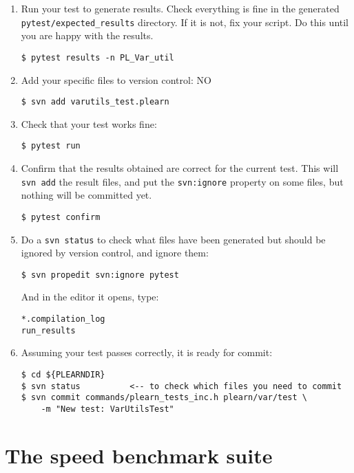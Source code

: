 \documentclass[11pt]{book}
\begin{document}
\begin{enumerate}
  \item Run your test to generate results. Check everything
  is fine in the generated {\tt pytest/expected\_results} directory. If
  it is not, fix your script. Do this until you are happy with the
  results.
\begin{verbatim}
$ pytest results -n PL_Var_util
\end{verbatim}

  \item Add your specific files to version control: NO
\begin{verbatim}
$ svn add varutils_test.plearn
\end{verbatim}

  \item \label{run} Check that your test works fine:
\begin{verbatim}
$ pytest run
\end{verbatim}

  \item \label{confirm} Confirm that the results obtained are correct
  for the current test. This will {\tt svn add} the result files, and
  put the {\tt svn:ignore} property on some files, but nothing will be
  committed yet.
\begin{verbatim}
$ pytest confirm
\end{verbatim}

  \item Do a {\tt svn status} to check what files have been generated
  but should be ignored by version control, and ignore them:
\begin{verbatim}
$ svn propedit svn:ignore pytest
\end{verbatim}
  And in the editor it opens, type:
\begin{verbatim}
*.compilation_log
run_results
\end{verbatim}

  \item Assuming your test passes correctly, it is ready for commit:
\begin{verbatim}
$ cd ${PLEARNDIR}
$ svn status          <-- to check which files you need to commit
$ svn commit commands/plearn_tests_inc.h plearn/var/test \
    -m "New test: VarUtilsTest"
\end{verbatim}
\end{enumerate}


\chapter{The speed benchmark suite}
\end{document}
